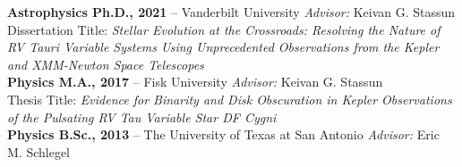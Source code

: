\documentclass[12pt]{article}
\begin{document}
\noindent\textbf{Astrophysics Ph.D., 2021} -- Vanderbilt University \hfill \textit{Advisor:} Keivan G. Stassun \\
\hspace*{1cm}Dissertation Title: {\it Stellar Evolution at the Crossroads: Resolving the Nature of RV Tauri Variable Systems Using Unprecedented Observations from the Kepler and XMM-Newton Space Telescopes} \\
\textbf{Physics M.A., 2017} -- Fisk University \hfill \textit{Advisor:} Keivan G. Stassun \\
\hspace*{1cm}Thesis Title: {\it Evidence for Binarity and Disk Obscuration in Kepler Observations of the Pulsating RV Tau Variable Star DF Cygni} \\
\textbf{Physics B.Sc., 2013} -- The University of Texas at San Antonio \hfill \textit{Advisor:} Eric M. Schlegel \\
\end{document}
